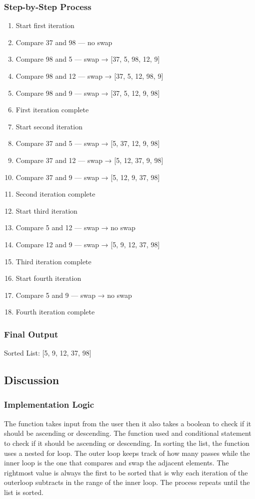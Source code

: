 \documentclass{article}
\begin{document}
\subsubsection*{Step-by-Step Process}
\begin{enumerate}[label=\arabic*.]
    \item Start first iteration
    \item Compare 37 and 98 — no swap
    \item Compare 98 and 5 — swap → [37, 5, 98, 12, 9]
    \item Compare 98 and 12 — swap → [37, 5, 12, 98, 9]
    \item Compare 98 and 9 — swap → [37, 5, 12, 9, 98]
    \item First iteration complete
    \item Start second iteration
    \item Compare 37 and 5 — swap → [5, 37, 12, 9, 98]
    \item Compare 37 and 12 — swap → [5, 12, 37, 9, 98]
    \item Compare 37 and 9 — swap → [5, 12, 9, 37, 98]
    \item Second iteration complete
    \item Start third iteration
    \item Compare 5 and 12 — swap → no swap
    \item Compare 12 and 9 — swap → [5, 9, 12, 37, 98]
    \item Third iteration complete
    \item Start fourth iteration
    \item Compare 5 and 9 — swap → no swap
    \item Fourth iteration complete
\end{enumerate}

\subsubsection*{Final Output}
    Sorted List: [5, 9, 12, 37, 98]

\subsection*{Discussion}
\subsubsection*{Implementation Logic}
The function takes input from the user then it also takes a boolean to check if it should be ascending or descending. The function used and conditional statement to check if it should be ascending or descending. In sorting the list, the function uses a nested for loop. The outer loop keeps track of how many passes while the inner loop is the one that compares and swap the adjacent elements. The rightmost value is always the first to be sorted that is why each iteration of the outerloop subtracts in the range of the inner loop. The process repeats until the list is sorted.
\end{document}
